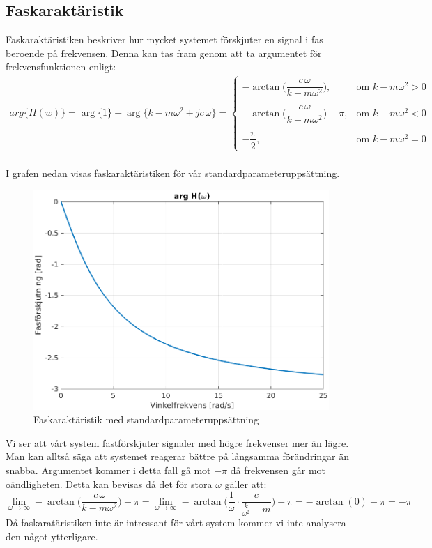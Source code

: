 \subsection{Faskaraktäristik}
Faskaraktäristiken beskriver hur mycket systemet förskjuter en signal i fas beroende på frekvensen. Denna kan tas fram genom att ta argumentet för frekvensfunktionen enligt:
\\$$\begin{aligned}arg\big\{H(w)\big\}=\arg\big\{1\big\}-\arg\big\{k-m\omega^2+jc\,\omega\big\}
=\begin{cases}
-\arctan\bigg(\dfrac{c\,\omega}{k-m\omega^2}\bigg), & \text{om } k-m\omega^2 > 0  \\\\
-\arctan\bigg(\dfrac{c\,\omega}{k-m\omega^2}\bigg)-\pi, & \text{om } k-m\omega^2 < 0 \\\\ 
-\dfrac{\pi}{2}, & \text{om } k-m\omega^2 = 0 
\end{cases}\end{aligned}$$
\\I grafen nedan visas faskaraktäristiken för vår standardparameteruppsättning.
\begin{figure}[H]
    \centering
    \includegraphics[scale=0.75]{bilder/faskaraktaristik}
    \caption{Faskaraktäristik med standardparameteruppsättning}
    \label{fig:faskaraktaristik}
\end{figure}
Vi ser att vårt system fastförskjuter signaler med högre frekvenser mer än lägre. Man kan alltså säga att systemet reagerar bättre på långsamma förändringar än snabba.
Argumentet kommer i detta fall gå mot $-\pi$ då frekvensen går mot oändligheten. Detta kan bevisas då det för stora $\omega$  gäller att:
$$\lim_{\omega\to\infty}-\arctan\bigg(\dfrac{c\,\omega}{k-m\omega^2}\bigg)-\pi=
\lim_{\omega\to\infty}-\arctan\Bigg(\dfrac{1}{\omega}\cdot\frac{c}{\frac{k}{\omega^2}-m}\Bigg)-\pi=-\arctan(0)-\pi=-\pi$$
Då faskaratäristiken inte är intressant för vårt system kommer vi inte analysera den något ytterligare.
\newpage
